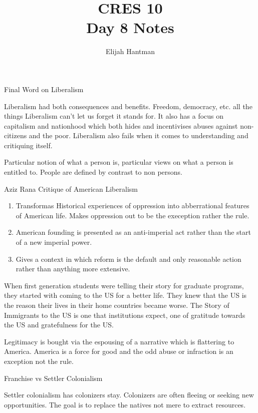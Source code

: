 \documentclass{report}
\title{\Huge{CRES 10}\\Day 8 Notes}
\author{\huge{Elijah Hantman}}
\date{}
\begin{document}
\maketitle
\newpage

\begin{description}
    \item Final Word on Liberalism
        \begin{mdframed}
            Liberalism had both consequences and
            benefits. Freedom, democracy, etc. all the
            things Liberalism can't let us forget it
            stands for. It also has a focus on capitalism
            and nationhood which both hides and incentivises
            abuses against non-citizens and the poor. Liberalism
            also fails when it comes to understanding
            and critiquing itself.

            Particular notion of what a person is, particular
            views on what a person is entitled to. People are
            defined by contrast to non persons.
        \end{mdframed}
        \begin{mdframed}
            Aziz Rana Critique of American Liberalism
            \begin{enumerate}
                \item Transformas Historical experiences of oppression
                    into abberrational features of American life. Makes
                    oppression out to be the exeception rather the rule.
                \item American founding is presented as an anti-imperial
                    act rather than the start of a new imperial power.

                \item Gives a context in which reform is the default
                    and only reasonable action rather than anything
                    more extensive.
            \end{enumerate}

            When first generation students were telling their story
            for graduate programs, they started with coming to the
            US for a better life. They knew that the US is the reason
            their lives in their home countries became worse.
            The Story of Immigrants to the US is one that institutions
            expect, one of gratitude towards the US and gratefulness
            for the US.

            Legitimacy is bought via the espousing of a narrative
            which is flattering to America. America is a force
            for good and the odd abuse or infraction is an exception
            not the rule.
        \end{mdframed}
    \item {\large Franchise vs Settler Colonialism}
        \begin{mdframed}
            Settler colonialism has colonizers stay.
            Colonizers are often fleeing or seeking new
            opportunities. The goal is to replace
            the natives not mere to extract resources.


\end{mdframed}
\end{description}
\end{document}
